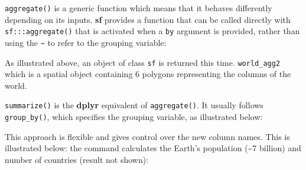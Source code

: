 \documentclass[]{krantz}
\newenvironment{Shaded}{\begin{snugshade}}{\end{snugshade}}
\newcommand{\CommentTok}[1]{\textcolor[rgb]{0.37,0.37,0.37}{\textit{#1}}}
\newcommand{\DataTypeTok}[1]{\textcolor[rgb]{0.27,0.27,0.27}{#1}}
\newcommand{\KeywordTok}[1]{\textcolor[rgb]{0.27,0.27,0.27}{\textbf{#1}}}
\newcommand{\NormalTok}[1]{#1}
\newcommand{\OperatorTok}[1]{\textcolor[rgb]{0.43,0.43,0.43}{\textbf{#1}}}
\newcommand{\OtherTok}[1]{\textcolor[rgb]{0.37,0.37,0.37}{#1}}
\newcommand{\StringTok}[1]{\textcolor[rgb]{0.5,0.5,0.5}{#1}}
\begin{document}
\texttt{aggregate()} is a generic function which means that it behaves differently depending on its inputs.
\textbf{sf} provides a function that can be called directly with \texttt{sf:::aggregate()} that is activated when a \texttt{by} argument is provided, rather than using the \texttt{\textasciitilde{}} to refer to the grouping variable:

\begin{Shaded}
\end{Shaded}

As illustrated above, an object of class \texttt{sf} is returned this time.
\texttt{world\_agg2} which is a spatial object containing 6 polygons representing the columns of the world.

\texttt{summarize()} is the \textbf{dplyr} equivalent of \texttt{aggregate()}.
It usually follows \texttt{group\_by()}, which specifies the grouping variable, as illustrated below:

\begin{Shaded}
\end{Shaded}

This approach is flexible and gives control over the new column names.
This is illustrated below: the command calculates the Earth's population (\textasciitilde{}7 billion) and number of countries (result not shown):

\begin{Shaded}
\end{Shaded}
\end{document}
